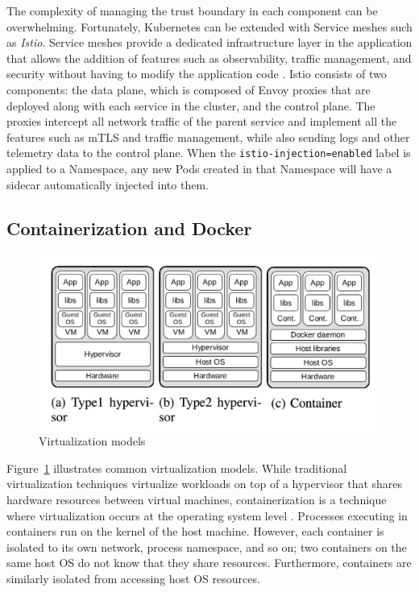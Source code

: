 \documentclass[english, 12pt, a4paper, sci, utf8, a-2b, online]{aaltothesis}
\begin{document}
The complexity of managing the trust boundary in each component can be overwhelming.
Fortunately, Kubernetes can be extended with Service meshes such as \emph{Istio}.
Service meshes provide a dedicated infrastructure layer in the application that allows the addition of features such as observability, traffic management, and security without having to modify the application code \cite{istio}.
Istio consists of two components: the data plane, which is composed of Envoy proxies that are deployed along with each service in the cluster, and the control plane.
The proxies intercept all network traffic of the parent service and implement all the features such as mTLS and traffic management, while also sending logs and other telemetry data to the control plane.
When the \lstinline{istio-injection=enabled} label is applied to a Namespace, any new Pods created in that Namespace will have a sidecar automatically injected into them.

\subsection{Containerization and Docker}

\begin{figure}[h!]
  \centering
  \includegraphics[width=\linewidth]{files/figure-1.png}
  \caption{Virtualization models \cite{combe2016docker}} %
  \label{figure-1}
\end{figure}

Figure~\ref{figure-1} illustrates common virtualization models.
While traditional virtualization techniques virtualize workloads on top of a hypervisor that shares hardware resources between virtual machines, containerization is a technique where virtualization occurs at the operating system level \cite{merkel2014docker}.
Processes executing in containers run on the kernel of the host machine.
However, each container is isolated to its own network, process namespace, and so on; two containers on the same host OS do not know that they share resources.
Furthermore, containers are similarly isolated from accessing host OS resources.
\end{document}

